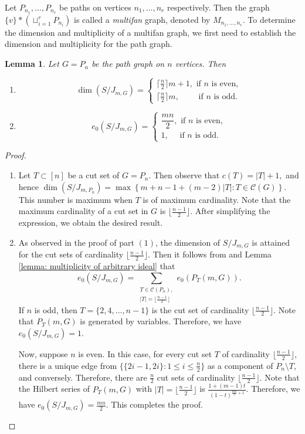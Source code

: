 \documentclass[12pt,reqno]{amsart}
\theoremstyle{plain}
\newtheorem{lemma}[theorem]{Lemma}
\theoremstyle{definition}
\begin{document}
Let $P_{n_1},\ldots,P_{n_r}$ be paths on vertices $n_1,\ldots,n_r$ respectively. Then the graph $\{v\}*(\sqcup_{i=1}^rP_{n_i})$ is called a \emph{multifan} graph, denoted by $M_{n_1,\ldots,n_r}$. To determine the dimension and multiplicity of a multifan graph, we first need to establish the dimension and multiplicity for the path graph.

\begin{lemma}\label{lemma: dimension and multiplicity of path graphs}
    Let $G=P_n$ be the path graph on $n$ vertices. Then
    \begin{enumerate}
        \item \label{lemma: dimension of path graphs} $$ \dim(S/J_{m,G})=
    \begin{cases}
        \lceil\frac{n}{2}\rceil m+1, \text{ if $n$ is even},\\
        \lceil\frac{n}{2}\rceil m,\quad\quad\text{ if $n$ is odd}.
    \end{cases}$$
    \item \label{lemma: multiplicity of path graphs} $$ e_0(S/J_{m,G})=
    \begin{cases}
        \dfrac{mn}{2}, \text{ if $n$ is even},\\
       1,\quad\text{  if $n$ is odd}.
    \end{cases}$$
    \end{enumerate}
\end{lemma}
\begin{proof}
\begin{enumerate}
    \item  Let $T\subset[n]$ be a cut set of $G=P_n$. Then observe that $c(T)=|T|+1,$ and hence $\dim(S/J_{m,P_n})=\max\left\{m+n-1+(m-2)|T|: T\in \mathscr{C}(G)\right\}.$ This number is maximum when $T$ is of maximum cardinality. Note that the maximum cardinality of a cut set in $G$ is $\lfloor \frac{n-1}{2}\rfloor$. After simplifying the expression, we obtain the desired result.
    \item  As observed in the proof of part $(1)$, the dimension of $S/J_{m,G}$ is attained for the cut sets of cardinality $\lfloor \frac{n-1}{2}\rfloor$.  Then it follows from \cite[Theorem 7]{GBI-Rauh-2013} and Lemma \ref{lemma: multiplicity of arbitrary ideal} that $$e_0(S/J_{m,G})=\sum_{\substack{T\in \mathscr{C}(P_n),\\|T|=\lfloor \frac{n-1}{2}\rfloor}}e_0(P_T(m,G)).$$
 If $n$ is odd, then $T=\{2,4,\ldots,n-1\}$ is the cut set of cardinality $\lfloor \frac{n-1}{2}\rfloor$. Note that $P_{T}(m,G)$ is generated by variables. Therefore, we have $e_0(S/J_{m,G})=1$. 

Now, suppose $n$ is even. In this case, for every cut set $T$ of cardinality $\lfloor \frac{n-1}{2}\rfloor$, there is a unique edge from $\{\{2i-1,2i\}:1\leq i\leq\frac{n}{2} \}$ as a component of $P_n\setminus T$, and conversely. Therefore, there are $\frac{n}{2}$ cut sets of cardinality $\lfloor \frac{n-1}{2}\rfloor$. Note that the Hilbert series of $P_T(m,G)$ with $|T|=\lfloor \frac{n-1}{2}\rfloor$ is $\frac{1+(m-1)t}{(1-t)^{\frac{mn}{2}+1}}$. Therefore, we have $e_0(S/J_{m,G})=\frac{mn}{2}$. This completes the proof.
\end{enumerate}
\end{proof}
\end{document}
